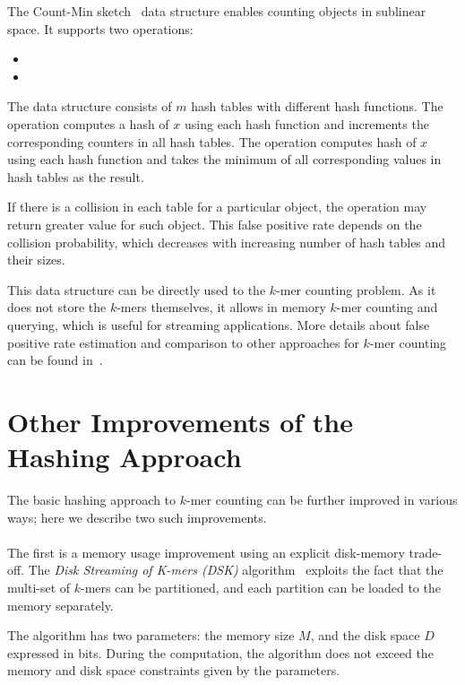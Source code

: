 The Count-Min sketch~\cite{countminsketch} data structure enables counting objects in sublinear space. It supports two operations:
\begin{itemize}
  \item {} %
  \item {} %
\end{itemize}

The data structure consists of $m$ hash tables with different hash functions.
The  operation computes a hash of $x$ using each hash function and increments the corresponding counters in all hash tables. The  operation computes hash of $x$ using each hash function and takes the minimum of all corresponding values in hash tables as the result. %

If there is a collision in each table for a particular object, the  operation may return greater value for such object. This false positive rate depends on the collision probability, which decreases with increasing number of hash tables and their sizes.

This data structure can be directly used to the $k$-mer counting problem. As it does not store the $k$-mers themselves, it allows in memory $k$-mer counting and querying, which is useful for streaming applications.
More details about false positive rate estimation and comparison to other approaches for $k$-mer counting can be found in~\cite{khmer}.

\section[Other Improvements]{Other Improvements of the Hashing Approach}

The basic hashing approach to $k$-mer counting can be further improved in various ways; here we describe two such improvements.

\paragraph{} The first is a memory usage improvement using an explicit disk-memory trade-off. The \emph{Disk Streaming of K-mers (DSK)} algorithm~\cite{dsk} exploits the fact that the multi-set of $k$-mers can be partitioned, and each partition can be loaded to the memory separately.

The algorithm has two parameters: the memory size $M$, and the disk space $D$ expressed in bits. During the computation, the algorithm does not exceed the memory and disk space constraints given by the parameters.

